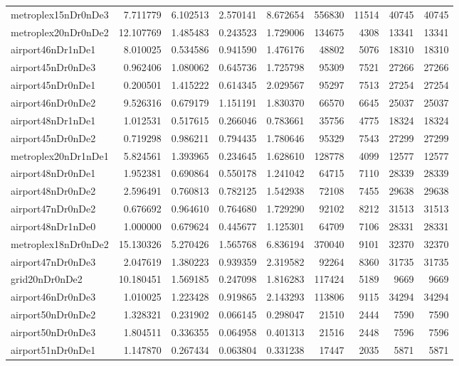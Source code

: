 \begin{longtable}{|l|r|r|r|r|r|r|r|r|}
metroplex15nDr0nDe3 & 7.711779 & 6.102513 & 2.570141 & 8.672654 & 556830 & 11514 & 40745 & 40745 \\
metroplex20nDr0nDe2 & 12.107769 & 1.485483 & 0.243523 & 1.729006 & 134675 & 4308 & 13341 & 13341 \\
airport46nDr1nDe1 & 8.010025 & 0.534586 & 0.941590 & 1.476176 & 48802 & 5076 & 18310 & 18310 \\
airport45nDr0nDe3 & 0.962406 & 1.080062 & 0.645736 & 1.725798 & 95309 & 7521 & 27266 & 27266 \\
airport45nDr0nDe1 & 0.200501 & 1.415222 & 0.614345 & 2.029567 & 95297 & 7513 & 27254 & 27254 \\
airport46nDr0nDe2 & 9.526316 & 0.679179 & 1.151191 & 1.830370 & 66570 & 6645 & 25037 & 25037 \\
airport48nDr1nDe1 & 1.012531 & 0.517615 & 0.266046 & 0.783661 & 35756 & 4775 & 18324 & 18324 \\
airport45nDr0nDe2 & 0.719298 & 0.986211 & 0.794435 & 1.780646 & 95329 & 7543 & 27299 & 27299 \\
metroplex20nDr1nDe1 & 5.824561 & 1.393965 & 0.234645 & 1.628610 & 128778 & 4099 & 12577 & 12577 \\
airport48nDr0nDe1 & 1.952381 & 0.690864 & 0.550178 & 1.241042 & 64715 & 7110 & 28339 & 28339 \\
airport48nDr0nDe2 & 2.596491 & 0.760813 & 0.782125 & 1.542938 & 72108 & 7455 & 29638 & 29638 \\
airport47nDr0nDe2 & 0.676692 & 0.964610 & 0.764680 & 1.729290 & 92102 & 8212 & 31513 & 31513 \\
airport48nDr1nDe0 & 1.000000 & 0.679624 & 0.445677 & 1.125301 & 64709 & 7106 & 28331 & 28331 \\
metroplex18nDr0nDe2 & 15.130326 & 5.270426 & 1.565768 & 6.836194 & 370040 & 9101 & 32370 & 32370 \\
airport47nDr0nDe3 & 2.047619 & 1.380223 & 0.939359 & 2.319582 & 92264 & 8360 & 31735 & 31735 \\
grid20nDr0nDe2 & 10.180451 & 1.569185 & 0.247098 & 1.816283 & 117424 & 5189 & 9669 & 9669 \\
airport46nDr0nDe3 & 1.010025 & 1.223428 & 0.919865 & 2.143293 & 113806 & 9115 & 34294 & 34294 \\
airport50nDr0nDe2 & 1.328321 & 0.231902 & 0.066145 & 0.298047 & 21510 & 2444 & 7590 & 7590 \\
airport50nDr0nDe3 & 1.804511 & 0.336355 & 0.064958 & 0.401313 & 21516 & 2448 & 7596 & 7596 \\
airport51nDr0nDe1 & 1.147870 & 0.267434 & 0.063804 & 0.331238 & 17447 & 2035 & 5871 & 5871 \\

\end{longtable}
